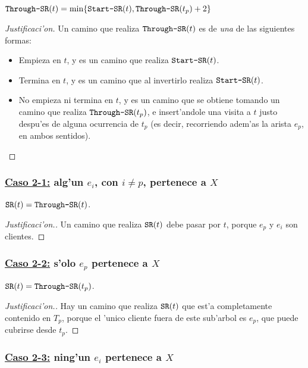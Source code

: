 \begin{claim}
$\texttt{Through-SR}(t) = \min\{\texttt{Start-SR}(t), \texttt{Through-SR}(t_p) + 2\}$

\begin{proof}[Justificaci'on]
Un camino que realiza $\texttt{Through-SR}(t)$ es de \emph{una} de las siguientes formas:
\begin{itemize}
\item Empieza en $t$, y es un camino que realiza $\texttt{Start-SR}(t)$.
\item Termina en $t$, y es un camino que al invertirlo realiza $\texttt{Start-SR}(t)$.
\item No empieza ni termina en $t$, y es un camino que se obtiene tomando un camino que realiza $\texttt{Through-SR}(t_p)$, e insert'andole una visita a $t$ justo despu'es de alguna ocurrencia de $t_p$ (es decir, recorriendo adem'as la arista $e_p$, en ambos sentidos).
\end{itemize}
\end{proof}
\end{claim}

\subsubsection*{\underline{Caso 2-1:} alg'un $e_i$, con $i \neq p$, pertenece a $X$}

\begin{claim}
$\texttt{SR}(t) = \texttt{Through-SR}(t)$.

\begin{proof}[Justificaci'on.]
Un camino que realiza $\texttt{SR}(t)$ debe pasar por $t$, porque $e_p$ y $e_i$ son clientes.
\end{proof}
\end{claim}

\subsubsection*{\underline{Caso 2-2:} s'olo $e_p$ pertenece a $X$}

\begin{claim}
$\texttt{SR}(t) = \texttt{Through-SR}(t_p)$.

\begin{proof}[Justificaci'on.]
Hay un camino que realiza $\texttt{SR}(t)$ que est'a completamente contenido en $T_p$, porque el 'unico cliente fuera de este sub'arbol es $e_p$, que puede cubrirse desde $t_p$.
\end{proof}
\end{claim}

\subsubsection*{\underline{Caso 2-3:} ning'un $e_i$ pertenece a $X$}

